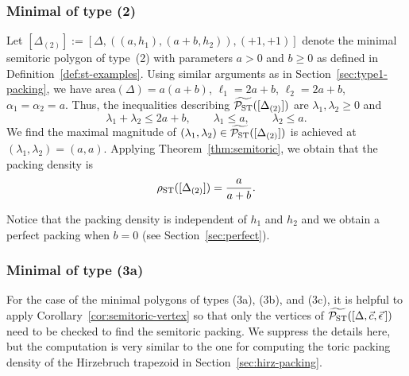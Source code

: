 \documentclass[pdftex]{sigma}
\numberwithin{equation}{section}
\newcommand{\De}{\Delta}
\newcommand{\PSTtilde}{\widetilde{\mathcal{P}_{\rm ST}}}
\newcommand{\stpoly}{[\De,\vec{c},\vec{\epsilon}\,]}
\begin{document}
\subsubsection{Minimal of type (2)} Let
$[\De_{(2)}] := [\De,((a,h_1),(a+b,h_2)),(+1,+1)]$
denote the minimal semitoric polygon of type~(2) with parameters $a>0$ and $b\geq 0$ as defined in Definition~\ref{def:st-examples}. Using similar arguments as in Section~\ref{sec:type1-packing}, we have $\textrm{area}(\De) = a(a+b)$, $\ell_1 = 2a+b$, $\ell_2 = 2a+b$, $\alpha_1 = \alpha_2 = a$. Thus, the inequalities describing $\PSTtilde([\De_{(2)}])$ are $\lambda_1,\lambda_2\geq 0$ and
\begin{equation*}
\lambda_1+\lambda_2 \leq 2a+b,\qquad
 \lambda_1 \leq a,\qquad
 \lambda_2 \leq a.
\end{equation*}
We find the maximal magnitude of $(\lambda_1,\lambda_2)\in\PSTtilde([\De_{(2)}])$ is achieved at $(\lambda_1,\lambda_2) = (a,a)$.
Applying Theorem~\ref{thm:semitoric}, we obtain that the packing density is
\begin{equation}\label{eqn:stpack-2}
\rho_{{\rm ST}} ([\De_{(2)}]) = \frac{a}{a+b}.
\end{equation}

Notice that the packing density is independent of $h_1$ and $h_2$ and we obtain a perfect packing when $b=0$ (see Section~\ref{sec:perfect}).

\subsubsection{Minimal of type (3a)}
For the case of the minimal polygons of types (3a), (3b), and (3c), it is helpful to apply Corollary~\ref{cor:semitoric-vertex} so that only the vertices of $\PSTtilde(\stpoly)$ need to be checked to find the semitoric packing.
We suppress the details here, but the computation is very similar to the one for computing the toric packing density of the Hirzebruch trapezoid in Section~\ref{sec:hirz-packing}.
\end{document}
